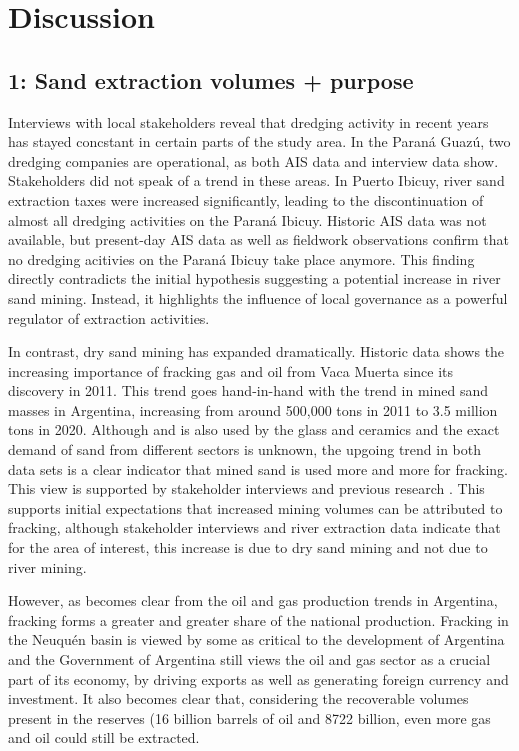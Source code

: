 \chapter{Discussion}

\section{1: Sand extraction volumes + purpose}
Interviews with local stakeholders reveal that dredging activity in recent years has stayed concstant in certain parts of the study area. In the Paraná Guazú, two dredging companies are operational, as both AIS data and interview data show. Stakeholders did not speak of a trend in these areas. In Puerto Ibicuy, river sand extraction taxes were increased significantly, leading to the discontinuation of almost all dredging activities on the Paraná Ibicuy. Historic AIS data was not available, but present-day AIS data as well as fieldwork observations confirm that no dredging acitivies on the Paraná Ibicuy take place anymore. This finding directly contradicts the initial hypothesis suggesting a potential increase in river sand mining. Instead, it highlights the influence of local governance as a powerful regulator of extraction activities.

In contrast, dry sand mining has expanded dramatically. Historic data shows the increasing importance of fracking gas and oil from Vaca Muerta since its discovery in 2011. This trend goes hand-in-hand with the trend in mined sand masses in Argentina, increasing from around 500,000 tons in 2011 to 3.5 million tons in 2020. Although and is also used by the glass and ceramics and the exact demand of sand from different sectors is unknown, the upgoing trend in both data sets is a clear indicator that mined sand is used more and more for fracking. This view is supported by stakeholder interviews and previous research \autocite{fogliaSedArena2023} \autocite{secretariadepoliticamineraArenasParaFracking2019}. This supports initial expectations that increased mining volumes can be attributed to fracking, although stakeholder interviews and river extraction data indicate that for the area of interest, this increase is due to dry sand mining and not due to river mining.

However, as becomes clear from the oil and gas production trends in Argentina, fracking forms a greater and greater share of the national production. Fracking in the Neuquén basin is viewed by some as critical to the development of Argentina and the Government of Argentina still views the oil and gas sector as a crucial part of its economy, by driving exports as well as generating foreign currency and investment. It also becomes clear that, considering the recoverable volumes present in the reserves (16 billion barrels of oil and 8722 billion, even more gas and oil could still be extracted.


